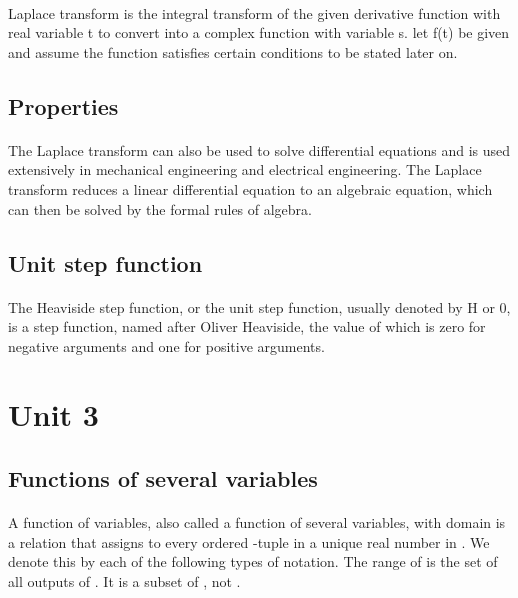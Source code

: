 \documentclass[12pt]{article}
\begin{document}
\paragraph{}
Laplace transform is the integral transform of the given derivative function with real variable t to convert into a complex function with variable s.  let f(t) be given and assume the function satisfies certain conditions to be stated later on.

\subsection{Properties}
\paragraph{}
The Laplace transform can also be used to solve differential equations and is used extensively in mechanical engineering and electrical engineering. The Laplace transform reduces a linear differential equation to an algebraic equation, which can then be solved by the formal rules of algebra.

\subsection{Unit step function}
\paragraph{}
The Heaviside step function, or the unit step function, usually denoted by H or 0, is a step function, named after Oliver Heaviside, the value of which is zero for negative arguments and one for positive arguments.
\newpage
\section{Unit 3}
\subsection{Functions of several variables}
\paragraph{}
A function of variables, also called a function of several variables, with domain is a relation that assigns to every ordered -tuple in a unique real number in . We denote this by each of the following types of notation. The range of is the set of all outputs of . It is a subset of , not .
\end{document}
